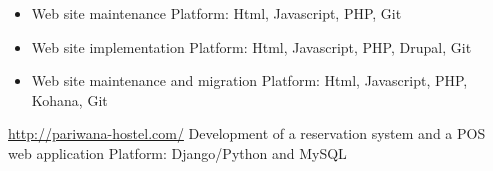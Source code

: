 \documentclass[11pt,a4paper]{moderncv}
\begin{document}
{\begin{itemize}
            IPhone native application
            \newline{}
            Herramientas: iOS SDK, Facebook SDK, Twitter SDK, Jenkins, Git
            \newline{}
            https://itunes.apple.com/us/app/agiles-2013/id566003713?mt=8
            \newline{}
        \item Web site maintenance
            \newline{}
            Platform: Html, Javascript, PHP, Git
            \newline{}
        \item Web site implementation
            \newline{}
            Platform: Html, Javascript, PHP, Drupal, Git
            \newline{}
        \item Web site maintenance and migration
            \newline{}
            Platform: Html, Javascript, PHP, Kohana, Git
            \newline{}
    \end{itemize}
}

{
    \url{http://pariwana-hostel.com/}
    \newline{}
    Development of a reservation system and a POS web application
    \newline{}
    Platform: Django/Python and MySQL
}

\end{document}
